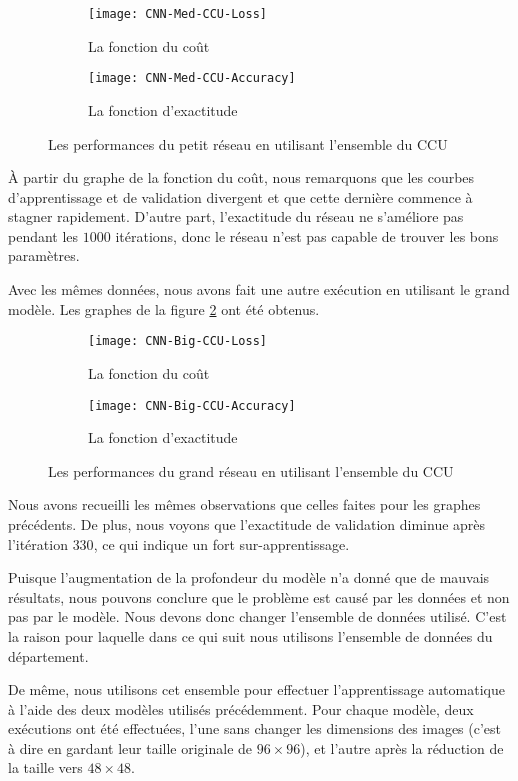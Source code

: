 \begin{figure}[h]
\centering
\begin{subfigure}{0.9\textwidth}
  \texttt{[image: CNN-Med-CCU-Loss]}
  \caption{La fonction du coût}
\end{subfigure}
\begin{subfigure}{0.9\textwidth}
  \texttt{[image: CNN-Med-CCU-Accuracy]}
  \caption{La fonction d'exactitude}
\end{subfigure}
\caption{Les performances du petit réseau en utilisant l'ensemble du CCU\label{fig:med_ccu}}
\end{figure}

\`A partir du graphe de la fonction du coût, nous remarquons que les courbes
d'apprentissage et de validation divergent et que cette dernière commence
à stagner rapidement. D'autre part, l'exactitude du réseau ne s'améliore pas
pendant les $1000$ itérations, donc le réseau n'est pas capable de trouver les bons
paramètres.

Avec les mêmes données, nous avons fait une autre exécution en utilisant le grand
modèle. Les graphes de la figure \ref{fig:big_ccu} ont été obtenus.

\begin{figure}[h]
\centering
\begin{subfigure}{0.9\textwidth}
  \texttt{[image: CNN-Big-CCU-Loss]}
  \caption{La fonction du coût}
\end{subfigure}
\begin{subfigure}{0.9\textwidth}
  \texttt{[image: CNN-Big-CCU-Accuracy]}
  \caption{La fonction d'exactitude}
\end{subfigure}
\caption{Les performances du grand réseau en utilisant l'ensemble du CCU\label{fig:big_ccu}}
\end{figure}

Nous avons recueilli les mêmes observations que celles faites pour les graphes précédents.
De plus, nous voyons que l'exactitude de validation diminue après l'itération
$330$, ce qui indique un fort sur-apprentissage.

Puisque l'augmentation de la profondeur du modèle n'a donné que de mauvais
résultats, nous pouvons conclure que le problème est causé par les données et non pas
par le modèle. Nous devons donc changer l'ensemble de données utilisé. C'est
la raison pour laquelle dans ce qui suit nous utilisons l'ensemble de données du département.

De même, nous utilisons cet ensemble pour effectuer l'apprentissage automatique
à l'aide des deux modèles utilisés précédemment. Pour chaque modèle, deux exécutions
ont été effectuées, l'une sans changer les dimensions des images (c'est à dire en
gardant leur taille originale de $96 \times 96$), et l'autre après la réduction
de la taille vers $48 \times 48$.

